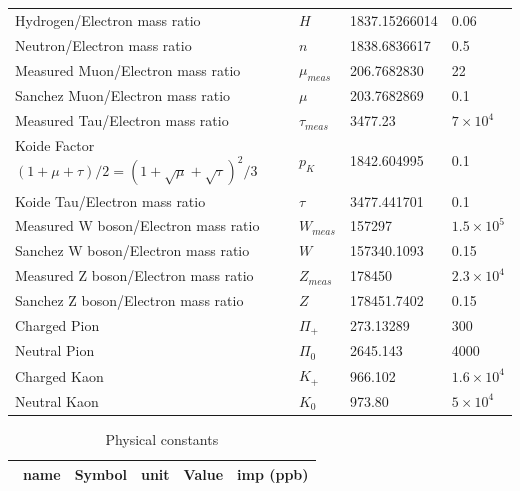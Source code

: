 \documentclass[a4paper,9pt]{article}
\begin{document}
\begin{appendix}
\begin{table}
\begin{tabular}{llll}
    Hydrogen/Electron mass ratio  & $H$  & 1837.15266014  & 0.06 \\      
    Neutron/Electron mass ratio  & $n$ & 1838.6836617  & 0.5 \\     
    Measured Muon/Electron mass ratio  & $\mu_{meas}$ & 206.7682830  & 22 \\     
    Sanchez Muon/Electron mass ratio  & $\mu$ & 203.7682869  & 0.1 \\     
    Measured Tau/Electron mass ratio  & $\tau_{meas}$ & 3477.23  & $7\times 10^4$ \\       
    Koide Factor $(1+\mu+\tau)/2 = (1+\sqrt\mu+\sqrt\tau)^2/3$ & $p_K$ & 1842.604995  & 0.1 \\ 
    Koide Tau/Electron mass ratio  & $\tau$ & 3477.441701  & 0.1 \\     
    Measured W boson/Electron mass ratio  & $W_{meas}$ & 157297  & $1.5 \times 10^5$ \\     
    Sanchez W boson/Electron mass ratio  & $W$ & 157340.1093  & 0.15 \\     
    Measured Z boson/Electron mass ratio  & $Z_{meas}$ & 178450  & $2.3 \times 10^4$ \\     
    Sanchez Z boson/Electron mass ratio  & $Z$ & 178451.7402  & 0.15 \\     
    Charged Pion & $\Pi_+$ & 273.13289  & 300 \\     
    Neutral Pion & $\Pi_0$ & 2645.143 & 4000 \\     
    Charged Kaon & $K_+$ & 966.102  & $1.6 \times 10^4$ \\     
    Neutral Kaon & $ K_0 $ & 973.80  & $ 5 \times 10^4$ \\     
         
   \bottomrule
  \end{tabular}
\end{table}


\begin{table}
\caption{Physical constants}
\label{tab:2:table2}
  \hskip-2.0cm\begin{tabular}{lllll}
    \toprule
    \cmidrule(r){1-5}
    \ name & Symbol  & unit  & Value & imp (ppb) \\
    \midrule
  

\end{tabular}
\end{table}
\end{appendix}
\end{document}
